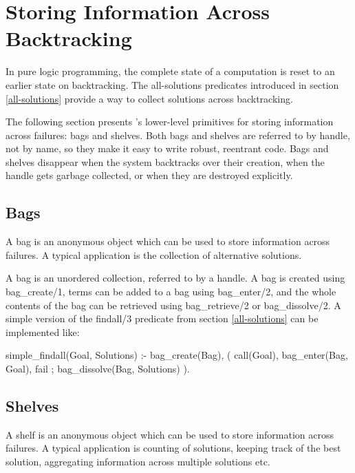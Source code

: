


\section{Storing Information Across Backtracking}

In pure logic programming, the complete state of a computation is
reset to an earlier state on backtracking.
The all-solutions predicates introduced in section \ref{all-solutions}
provide a way to collect solutions across backtracking.

The following section presents \eclipse's lower-level primitives for storing
information across failures: bags and shelves.
Both bags and shelves are referred to by handle, not by name,
so they make it easy to write robust, reentrant code.
Bags and shelves disappear when the system backtracks over their
creation, when the handle gets garbage collected, or when they are
destroyed explicitly.


\subsection{Bags}

A bag is an anonymous object which can be used to store information
across failures.  A typical application is the collection of
alternative solutions.

A bag is an unordered collection, referred to by a handle.
A bag is created using bag_create/1, terms can be added to a bag using
bag_enter/2, and the whole contents of the bag can be retrieved
using bag_retrieve/2 or bag_dissolve/2.
A simple version of the findall/3 predicate from section \ref{all-solutions}
can be implemented like:
\begin{code}
simple_findall(Goal, Solutions) :-
        bag_create(Bag),
        (
            call(Goal),
            bag_enter(Bag, Goal),
            fail
        ;
            bag_dissolve(Bag, Solutions)
        ).
\end{code}


\subsection{Shelves}

A shelf is an anonymous object which can be used to store information
across failures. A typical application is counting of solutions,
keeping track of the best solution, 
aggregating information across multiple solutions etc. 

